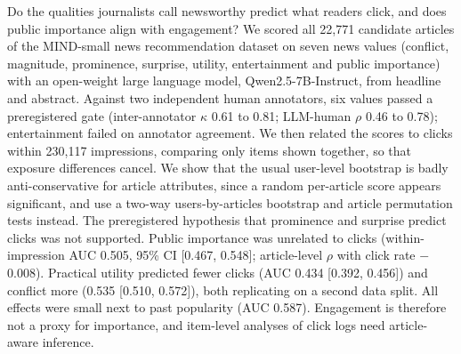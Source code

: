 Do the qualities journalists call newsworthy predict what readers click, and does public importance align with engagement? We scored all 22,771 candidate articles of the MIND-small news recommendation dataset on seven news values (conflict, magnitude, prominence, surprise, utility, entertainment and public importance) with an open-weight large language model, Qwen2.5-7B-Instruct, from headline and abstract. Against two independent human annotators, six values passed a preregistered gate (inter-annotator $\kappa$ 0.61 to 0.81; LLM-human $\rho$ 0.46 to 0.78); entertainment failed on annotator agreement. We then related the scores to clicks within 230,117 impressions, comparing only items shown together, so that exposure differences cancel. We show that the usual user-level bootstrap is badly anti-conservative for article attributes, since a random per-article score appears significant, and use a two-way users-by-articles bootstrap and article permutation tests instead. The preregistered hypothesis that prominence and surprise predict clicks was not supported. Public importance was unrelated to clicks (within-impression AUC 0.505, 95\% CI [0.467, 0.548]; article-level $\rho$ with click rate $-$0.008). Practical utility predicted fewer clicks (AUC 0.434 [0.392, 0.456]) and conflict more (0.535 [0.510, 0.572]), both replicating on a second data split. All effects were small next to past popularity (AUC 0.587). Engagement is therefore not a proxy for importance, and item-level analyses of click logs need article-aware inference.
